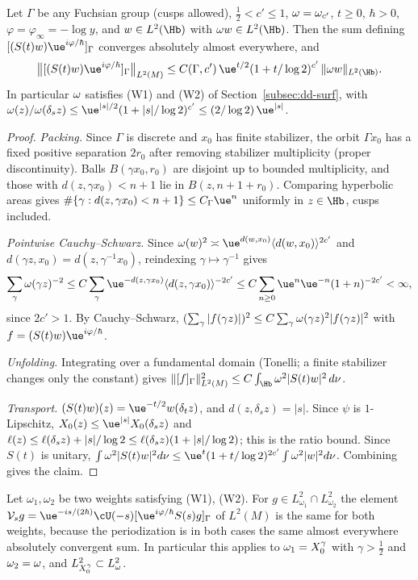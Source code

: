 \begin{proposition}\label{os:p1}
Let $\Gamma$ be any Fuchsian group (cusps allowed), $\tfrac12<c'\le1$, $\omega=\omega_{c'}$, $t\ge0$, $\hbar>0$, $\varphi=\varphi_\infty=-\log y$, and
$w\in L^2(\Hb)$ with $\osomp w\in L^2(\Hb)$. Then the sum defining $[(S(t)w)\ue^{i\varphi/\hbar}]_\Gamma$ converges absolutely almost everywhere, and
\[
\bigl\|[(S(t)w)\ue^{i\varphi/\hbar}]_\Gamma\bigr\|_{L^2(M)}\le C(\Gamma,c')\,\ue^{t/2}(1+t/\log2)^{c'}\,\|\osomp w\|_{L^2(\Hb)}.
\]
In particular $\omega$ satisfies \textup{(W1)} and \textup{(W2)} of Section~\ref{subsec:dd-surf}, with
$\osomp(z)/\osomp(\delta_sz)\le\ue^{|s|/2}(1+|s|/\log2)^{c'}\le(2/\log2)\,\ue^{|s|}$.
\end{proposition}
\begin{proof}
\emph{Packing.} Since $\Gamma$ is discrete and $x_0$ has finite stabilizer, the orbit $\Gamma x_0$ has a fixed positive separation $2r_0$ after
removing stabilizer multiplicity (proper discontinuity). Balls $B(\gamma x_0,r_0)$ are disjoint up to bounded multiplicity, and those with
$d(z,\gamma x_0)<n+1$ lie in $B(z,n+1+r_0)$. Comparing hyperbolic areas gives $\#\{\gamma:d(z,\gamma x_0)<n+1\}\le C_\Gamma\ue^n$ uniformly in $z\in\Hb$, cusps
included.

\emph{Pointwise Cauchy--Schwarz.} Since $\osomp(w)^2\asymp\ue^{d(w,x_0)}\osbr{d(w,x_0)}^{2c'}$ and $d(\gamma z,x_0)=d(z,\gamma^{-1}x_0)$,
reindexing $\gamma\mapsto\gamma^{-1}$ gives
\[
\sum_\gamma\osomp(\gamma z)^{-2}\le C\sum_\gamma\ue^{-d(z,\gamma x_0)}\osbr{d(z,\gamma x_0)}^{-2c'}\le C\sum_{n\ge0}\ue^{n}\ue^{-n}(1+n)^{-2c'}<\infty,
\]
since $2c'>1$. By Cauchy--Schwarz, $(\sum_\gamma|f(\gamma z)|)^2\le C\sum_\gamma\omega(\gamma z)^2|f(\gamma z)|^2$ with $f=(S(t)w)\ue^{i\varphi/\hbar}$.

\emph{Unfolding.} Integrating over a fundamental domain (Tonelli; a finite stabilizer changes only the constant) gives
$\|[f]_\Gamma\|^2_{L^2(M)}\le C\int_\Hb\osomp^2|S(t)w|^2\,d\nu$.

\emph{Transport.} $(S(t)w)(z)=\ue^{-t/2}w(\delta_tz)$, and $d(z,\delta_sz)=|s|$. Since $\psi$ is $1$-Lipschitz, $\osX(z)\le\ue^{|s|}\osX(\delta_sz)$ and
$\ell(z)\le\ell(\delta_sz)+|s|/\log2\le\ell(\delta_sz)(1+|s|/\log2)$; this is the ratio bound. Since $S(t)$ is unitary,
$\int\osomp^2|S(t)w|^2d\nu\le\ue^{t}(1+t/\log2)^{2c'}\int\osomp^2|w|^2d\nu$. Combining gives the claim.
\end{proof}

\begin{remark}\label{os:indep}
Let $\omega_1,\omega_2$ be two weights satisfying \textup{(W1)}, \textup{(W2)}. For $g\in L^2_{\omega_1}\cap L^2_{\omega_2}$ the element
$\mathcal V_sg=\ue^{-is/(2\hbar)}\cU(-s)[\ue^{i\varphi/\hbar}S(s)g]_\Gamma$ of $L^2(M)$ is the same for both weights, because the periodization is in both
cases the same almost everywhere absolutely convergent sum. In particular this applies to $\omega_1=X_0^{\gamma}$ with $\gamma>\tfrac12$ and
$\omega_2=\omega$, and $L^2_{X_0^\gamma}\subset L^2_{\omega}$.
\end{remark}

